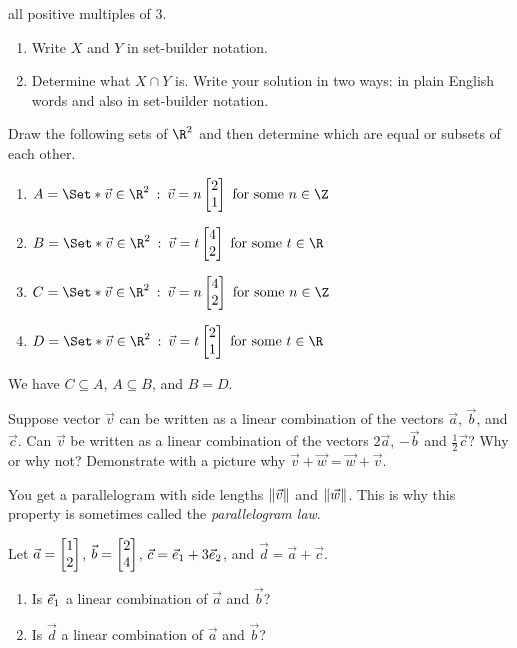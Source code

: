 \begin{exercises}
\begin{problist}
			all positive multiples of $3$.
			\begin{enumerate}
				\item Write $X$ and $Y$ in set-builder notation.
				\item Determine what $X\cap Y$ is. Write your solution in two ways: in
					plain English words and also in set-builder notation.
			\end{enumerate}
		\prob
			Draw the following sets of $\R^2$ and then determine which are equal or
			subsets of each other.
			\begin{enumerate}
				\item $A=\Set*{\vec v\in\R^2\given \vec v=n\mat{2\\1} \text{ for some }n\in\Z}$
				\item $B=\Set*{\vec v\in\R^2\given \vec v=t\mat{4\\2}\text{ for some }t\in\R}$
				\item $C=\Set*{\vec v\in\R^2\given \vec v=n\mat{4\\2} \text{ for some }n\in\Z}$
				\item $D=\Set*{\vec v\in\R^2\given \vec v=t\mat{2\\1}\text{ for some }t\in\R}$
			\end{enumerate}
			\begin{solution}
				We have $C\subseteq A$, $A\subseteq B$, and $B=D$.
			\end{solution}
		\prob
			Suppose vector $\vec v$ can be written as a linear combination of the
			vectors $\vec a$, $\vec b$, and $\vec c$. Can $\vec v$ be written as a
			linear combination of the vectors $2\vec a$, $-\vec b$ and
			$\frac12\vec c$? Why or why not?
		\prob
			Demonstrate with a picture why $\vec v + \vec w = \vec w + \vec v$.
			\begin{solution}
				You get a parallelogram with side lengths $\lVert\vec v\rVert$ and
				$\lVert\vec w\rVert$. This is why this property is sometimes called the
				\emph{parallelogram law}.
			\end{solution}
		\prob Let $\vec a=\mat{1\\2}$, $\vec b=\mat{2\\4}$, $\vec c={\vec e_1}+3{\vec e_2}$, and $\vec d=\vec a+\vec c$.
		\begin{enumerate}
			\item Is ${\vec e_1}$ a linear combination of $\vec a$ and $\vec b$?
			\item Is $\vec d$ a linear combination of $\vec a$ and $\vec b$?

\end{enumerate}
\end{problist}
\end{exercises}
